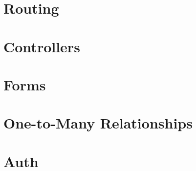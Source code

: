 \documentclass[b5paper,openany]{book}
\begin{document}
\chapter{Routing}


\chapter{Controllers}


\chapter{Forms}


\chapter{One-to-Many Relationships}


\chapter{Auth}








\end{document}
